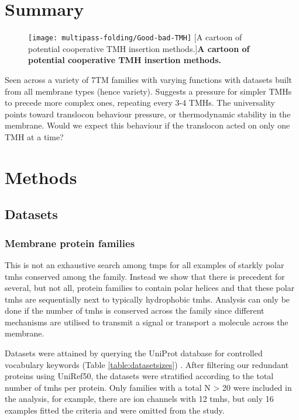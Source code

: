 \section{Summary}

\begin{figure}[!ht]
\centering
\texttt{[image: multipass-folding/Good-bad-TMH]}
		[A cartoon of potential cooperative TMH insertion methods.]{\textbf{A cartoon of potential cooperative TMH insertion methods.}}

\label{fig:Good-bad-TMH}
\end{figure}

Seen across a variety of 7TM families with varying functions with datasets built from all membrane types (hence variety).
Suggests a pressure for simpler TMHs to precede more complex ones, repeating every 3-4 TMHs.
The universality points toward translocon behaviour pressure, or thermodynamic stability in the membrane.
Would we expect this behaviour if the translocon acted on only one TMH at a time?

\section{Methods}
\subsection{Datasets}
\subsubsection{Membrane protein families}
This is not an exhaustive search among \gls{tmp}s for all examples of starkly polar \gls{tmh}s conserved among the family.
Instead we show that there is precedent for several, but not all, protein families to contain polar helices and that these polar \gls{tmh}s are sequentially next to typically hydrophobic \gls{tmh}s.
Analysis can only be done if the number of \gls{tmh}s is conserved across the family since different mechanisms are utilised to transmit a signal or transport a molecule across the membrane.

Datasets were attained by querying the UniProt database for controlled vocabulary keywords (Table \ref{table:datasetsizes}) \cite{TheUniProtConsortium2014}.
After filtering our redundant proteins using UniRef50, the datasets were stratified according to the total number of \gls{tmh}s per protein.
Only families with a total N > 20 were included in the analysis, for example, there are ion channels with 12 \gls{tmh}s, but only 16 examples fitted the criteria and were omitted from the study.



